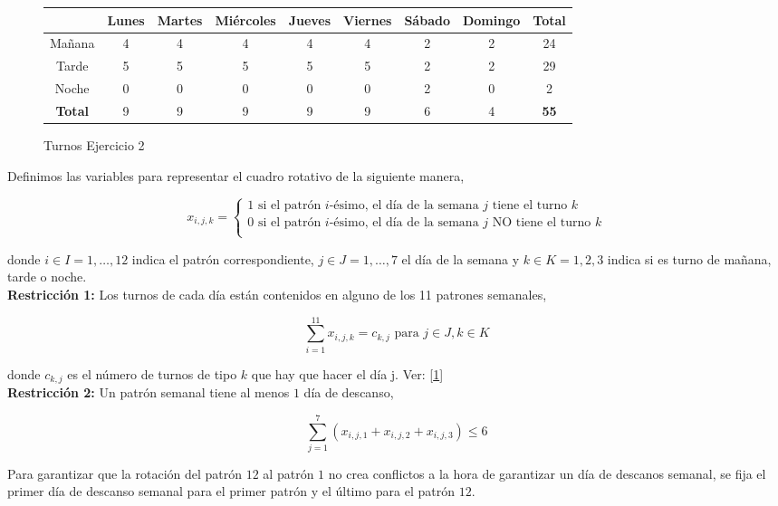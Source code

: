 \documentclass[a4paper,12pt]{article}
\begin{document}
\begin{figure}[h!]
\centering
\begin{tabular}{| c | c | c | c | c | c | c | c | c |}
\hline
& Lunes & Martes & Mi\'ercoles & Jueves & Viernes & S\'abado & Domingo & \textbf{Total}\\
\hline
\hline
Ma\~nana & 4 & 4 & 4 & 4 & 4 & 2 & 2 & 24\\
\hline
Tarde & 5 & 5 & 5 & 5 & 5 & 2 & 2 & 29\\
\hline
Noche & 0 & 0 & 0 & 0 & 0 & 2 & 0 & 2\\
\hline
\textbf{Total} & 9 & 9 & 9 & 9 & 9 & 6 & 4 & \textbf{55}\\
\hline
\end{tabular}
\caption{Turnos Ejercicio 2}
\label{turnos}
\end{figure}

Definimos las variables para representar el cuadro rotativo de la siguiente manera,	
	
	\begin{equation*}
	x_{i,j,k} = \left\lbrace \begin{array}{l}
		1 \text{ si el patr\'on } i\text{-\'esimo, el d\'ia de la semana } j \text{  tiene el turno } k \\
		0 \text{ si el patr\'on } i\text{-\'esimo, el d\'ia de la semana } j \text{  NO tiene el turno } k \\
	\end{array}
	\right. 
	\end{equation*}

donde $i\in I={1,\dots, 12}$ indica el patr\'on correspondiente, $j\in J={1,\dots, 7}$ el d\'ia de la semana y $k\in K={1,2,3}$ indica si es turno de mañana, tarde o noche.\\

\textbf{Restricci\'on 1:} Los turnos de cada d\'ia est\'an contenidos en alguno de los 11 patrones semanales,

$$ \sum_{i=1}^{11} x_{i,j,k} = c_{k,j} \text{ para } j\in J, k\in K$$

donde $c_{k,j}$ es el n\'umero de turnos de tipo $k$ que hay que hacer el d\'ia j. Ver: [\ref{turnos}] \\

\textbf{Restricci\'on 2:} Un patr\'on semanal tiene al menos $1$ d\'ia de descanso,

$$ \sum_{j=1}^{7}{(x_{i,j,1} + x_{i,j,2} + x_{i,j,3})} \leq 6 $$

Para garantizar que la rotaci\'on del patr\'on $12$ al patr\'on $1$ no crea conflictos a la hora de garantizar un d\'ia de descanos semanal, se fija el primer d\'ia de descanso semanal para el primer patr\'on y el \'ultimo para el patr\'on $12$.
\end{document}
